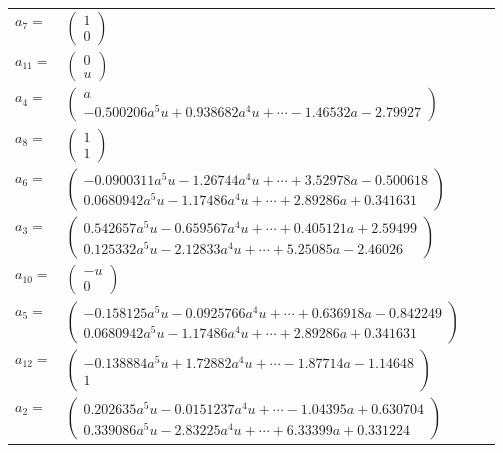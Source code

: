 \documentclass[1p]{elsarticle_modified}
\theoremstyle{definition}
\begin{document}
\begin{tabular}{m{7pt} m{180pt} m{7pt} m{180pt} }
\flushright $a_{7}=$&$\begin{pmatrix}1\\0\end{pmatrix}$ \\
\flushright $a_{11}=$&$\begin{pmatrix}0\\u\end{pmatrix}$ \\
\flushright $a_{4}=$&$\begin{pmatrix}a\\-0.500206 a^{5} u+0.938682 a^{4} u+\cdots-1.46532 a-2.79927\end{pmatrix}$ \\
\flushright $a_{8}=$&$\begin{pmatrix}1\\1\end{pmatrix}$ \\
\flushright $a_{6}=$&$\begin{pmatrix}-0.0900311 a^{5} u-1.26744 a^{4} u+\cdots+3.52978 a-0.500618\\0.0680942 a^{5} u-1.17486 a^{4} u+\cdots+2.89286 a+0.341631\end{pmatrix}$ \\
\flushright $a_{3}=$&$\begin{pmatrix}0.542657 a^{5} u-0.659567 a^{4} u+\cdots+0.405121 a+2.59499\\0.125332 a^{5} u-2.12833 a^{4} u+\cdots+5.25085 a-2.46026\end{pmatrix}$ \\
\flushright $a_{10}=$&$\begin{pmatrix}- u\\0\end{pmatrix}$ \\
\flushright $a_{5}=$&$\begin{pmatrix}-0.158125 a^{5} u-0.0925766 a^{4} u+\cdots+0.636918 a-0.842249\\0.0680942 a^{5} u-1.17486 a^{4} u+\cdots+2.89286 a+0.341631\end{pmatrix}$ \\
\flushright $a_{12}=$&$\begin{pmatrix}-0.138884 a^{5} u+1.72882 a^{4} u+\cdots-1.87714 a-1.14648\\1\end{pmatrix}$ \\
\flushright $a_{2}=$&$\begin{pmatrix}0.202635 a^{5} u-0.0151237 a^{4} u+\cdots-1.04395 a+0.630704\\0.339086 a^{5} u-2.83225 a^{4} u+\cdots+6.33399 a+0.331224\end{pmatrix}$ \\

\end{tabular}
\end{document}
